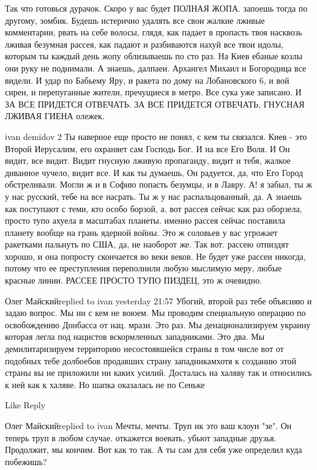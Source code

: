 Так что готовься дурачок. Скоро у вас будет ПОЛНАЯ ЖОПА. запоешь тогда по
другому, зомбик. Будешь истерично удалять все свои жалкие лживые комментарии,
рвать на себе волосы, глядя, как падает в пропасть твоя насквозь лживая
безумная рассея, как падают и разбиваются нахуй все твои идолы, которым ты
каждый день жопу облизываешь по сто раз. На Киев ебаные козлы они руку не
поднимали. А знаешь, далпаеи. Архангел Михаил и Богородица все видели. И удар
по Бабьему Яру, и ракета по дому на Лобановского 6, и вой сирен, и перепуганные
жители, пречущиеся в метро. Все сука уже записано. И ЗА ВСЕ ПРИДЕТСЯ ОТВЕЧАТЬ.
ЗА ВСЕ ПРИДЕТСЯ ОТВЕЧАТЬ, ГНУСНАЯ ЛЖИВАЯ ГИЕНА олежек.

ivan demidov 2 Ты наверное еще просто не понял, с кем ты связался. Киев - это
Второй Иерусалим, его охраняет сам Господь Бог. И на все Его Воля. И Он видит,
все видит. Видит гнусную лживую пропаганду, видит и тебя, жалкое диванное
чучело, видит все. И как ты думаешь, Он радуется, да, что Его Город
обстреливали. Могли ж и в Софию попасть безумцы, и в Лавру. А! я забыл, ты ж у
нас русский, тебе на все насрать. Ты ж у нас распальцованный, да. А знаешь как
поступают с теми, кто особо борзой, а. вот рассея сейчас как раз оборзела,
просто тупо ахуела в масштабах планеты. именно рассея сейчас поставила планету
вообще на грань ядерной войны. Это ж соловьев у вас угрожает ракетками пальнуть
по США, да, не наоборот же. Так вот. рассею отпиздят хорошо, и она попросту
скончается во веки веков. Не будет уже рассеи никогда, потому что ее
преступления переполнили любую мыслимую меру, любые красные линии. РАССЕЕ
ПРОСТО ТУПО ПИЗДЕЦ, это ж очевидно.

Олег Майскийreplied to ivan yesterday 21:57 Убогий, второй раз тебе объясняю и
задаю вопрос. Мы ни с кем не воюем. Мы проводим специальную операцию по
освобождению Донбасса от нац. мрази. Это раз. Мы денационализируем украину
которая легла под нацистов вскормленных западниками. Это два. Мы
демилитаризируем территорию несостоявшейся страны в том числе вот от подобных
тебе долбоебов продавших страну западникамхотя к созданию этой страны вы не
приложили ни каких усилий. Досталась на халяву так и относились к ней как к
халяве. Но шапка оказалась не по Сеньке

		Like Reply

Олег Майскийreplied to ivan Мечты, мечты. Труп ик это ваш клоун "зе". Он теперь
труп в любом случае. откажется воевать, убьют западные друзья. Продолжит, мы
кончим. Вот как то так. А ты сам для себя уже определил куда побежишь?

